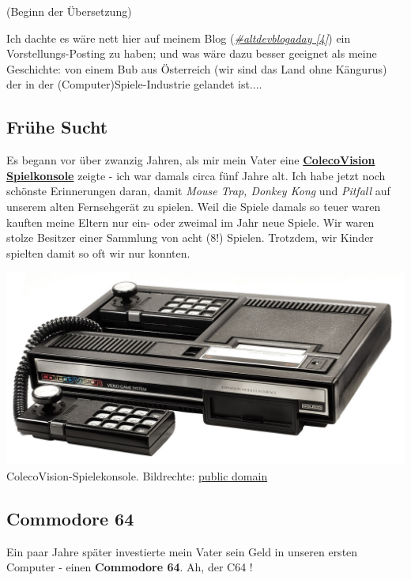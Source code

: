 (Beginn der Übersetzung)

Ich dachte es wäre nett hier auf meinem Blog (\href{http://www.altdevblogaday.com/}{\textit{\#altdevblogaday [4]}}) ein Vorstellungs-Posting zu haben; und was wäre dazu besser geeignet als meine Geschichte: von einem Bub aus Österreich (wir sind das Land ohne Kängurus) der in der (Computer)Spiele-Industrie gelandet ist....

\subsection*{Frühe Sucht}

Es begann vor über zwanzig Jahren, als mir mein Vater eine \href{https://de.wikipedia.org/wiki/Colecovision}{\textbf{ColecoVision Spielkonsole}} 
zeigte - ich war damals circa fünf Jahre alt. Ich habe jetzt noch schönste Erinnerungen daran, damit \textit{Mouse Trap, Donkey Kong} und \textit{Pitfall} auf unserem alten Fernsehgerät zu spielen. Weil die Spiele damals so teuer waren kauften meine Eltern nur ein- oder zweimal im Jahr neue Spiele. Wir waren stolze Besitzer einer Sammlung von acht (8!) Spielen. Trotzdem, wir Kinder spielten damit so oft wir nur konnten.
\begin{center}
\includegraphics[width=0.9\linewidth]{austrianguy/austrianguy-colecovision.jpg}\\
\footnotesize{ColecoVision-Spielekonsole. Bildrechte: \href{https://commons.wikimedia.org/wiki/File:Coleco-vision-console.jpg}{public domain}}
\end{center}

\subsection*{Commodore 64}

Ein paar Jahre später investierte mein Vater sein Geld in unseren ersten Computer - einen \textbf{Commodore 64}. Ah, der C64 !

